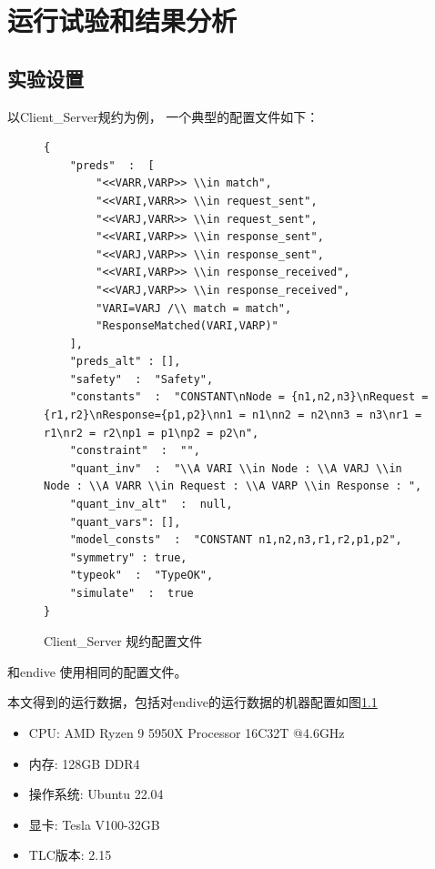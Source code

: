 \chapter{运行试验和结果分析}\label{chap:run-analysis}

\section{实验设置}

以{Client\_Server}规约为例， 一个典型的配置文件如下：
\begin{figure}[htb]
    \centering
\begin{lstlisting}[]
{
    "preds"  :  [
        "<<VARR,VARP>> \\in match",
        "<<VARI,VARR>> \\in request_sent",
        "<<VARJ,VARR>> \\in request_sent",
        "<<VARI,VARP>> \\in response_sent",
        "<<VARJ,VARP>> \\in response_sent",
        "<<VARI,VARP>> \\in response_received",
        "<<VARJ,VARP>> \\in response_received",
        "VARI=VARJ /\\ match = match",
        "ResponseMatched(VARI,VARP)"
    ],
    "preds_alt" : [],
    "safety"  :  "Safety",
    "constants"  :  "CONSTANT\nNode = {n1,n2,n3}\nRequest = {r1,r2}\nResponse={p1,p2}\nn1 = n1\nn2 = n2\nn3 = n3\nr1 = r1\nr2 = r2\np1 = p1\np2 = p2\n",
    "constraint"  :  "",
    "quant_inv"  :  "\\A VARI \\in Node : \\A VARJ \\in Node : \\A VARR \\in Request : \\A VARP \\in Response : ",
    "quant_inv_alt"  :  null,
    "quant_vars": [],
    "model_consts"  :  "CONSTANT n1,n2,n3,r1,r2,p1,p2",
    "symmetry" : true,
    "typeok"  :  "TypeOK",
    "simulate"  :  true      
}
\end{lstlisting}
\caption{Client\_Server 规约配置文件}
\label{lst:config}
\end{figure}


\rltla 和endive 使用相同的配置文件。

本文得到的运行数据，包括对endive的运行数据的机器配置如图\ref{lst:config}
\begin{itemize}
    \item CPU: AMD Ryzen 9 5950X Processor 16C32T @4.6GHz
    \item 内存: 128GB DDR4 
    \item 操作系统: Ubuntu 22.04
    \item 显卡: Tesla V100-32GB
    \item TLC版本: 2.15
\end{itemize}


